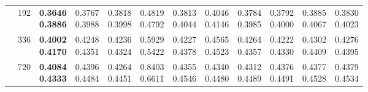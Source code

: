\begin{longtable}{@{}llcccccccccc@{}}
 & 192 & \shortstack{\colorbox[gray]{0.82}{\textbf{0.3646}}\\\colorbox[gray]{0.82}{\textbf{0.3886}}} & \shortstack{\colorbox[gray]{0.92}{0.3767}\\0.3988} & \shortstack{0.3818\\0.3998} & \shortstack{0.4819\\0.4792} & \shortstack{0.3813\\0.4044} & \shortstack{0.4046\\0.4146} & \shortstack{0.3784\\\colorbox[gray]{0.92}{0.3985}} & \shortstack{0.3792\\0.4000} & \shortstack{0.3885\\0.4067} & \shortstack{0.3830\\0.4023} \\ \cline{2-12}

 & 336 & \shortstack{\colorbox[gray]{0.82}{\textbf{0.4002}}\\\colorbox[gray]{0.82}{\textbf{0.4170}}} & \shortstack{0.4248\\0.4351} & \shortstack{0.4236\\\colorbox[gray]{0.92}{0.4324}} & \shortstack{0.5929\\0.5422} & \shortstack{0.4227\\0.4378} & \shortstack{0.4565\\0.4523} & \shortstack{0.4264\\0.4357} & \shortstack{\colorbox[gray]{0.92}{0.4222}\\0.4330} & \shortstack{0.4302\\0.4409} & \shortstack{0.4276\\0.4395} \\ \cline{2-12}

 & 720 & \shortstack{\colorbox[gray]{0.82}{\textbf{0.4084}}\\\colorbox[gray]{0.82}{\textbf{0.4333}}} & \shortstack{0.4396\\0.4484} & \shortstack{\colorbox[gray]{0.92}{0.4264}\\\colorbox[gray]{0.92}{0.4451}} & \shortstack{0.8403\\0.6611} & \shortstack{0.4355\\0.4546} & \shortstack{0.4340\\0.4480} & \shortstack{0.4312\\0.4489} & \shortstack{0.4376\\0.4491} & \shortstack{0.4377\\0.4528} & \shortstack{0.4379\\0.4534} \\ \hline


\end{longtable}
